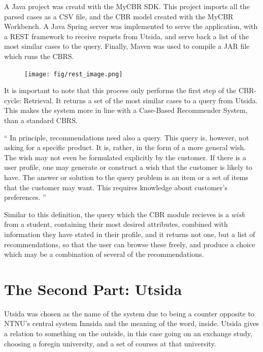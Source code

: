 A Java project was creatd with the MyCBR SDK. This project imports all the parsed cases as a CSV file, and the CBR model created with the MyCBR Workbench. A Java Spring server was implemented to serve the application, with a REST framework to receive requets from Utsida, and serve back a list of the most similar cases to the query. Finally, Maven was used to compile a JAR file which runs the CBRS. 

\begin{figure}[H]
    \centering
    \texttt{[image: fig/rest\_image.png]}
\end{figure}

It is important to note that this process only performs the first step of the CBR-cycle: Retrieval. It returns a set of the most similar cases to a query from Utsida. This makes the system more in line with a Case-Based Recommender System, than a standard CBRS. 

\begin{displayquote}\enquote{
In principle, recommendations need also a query. This query is, however, not asking
for a specific product. It is, rather, in the form of a more general wish. The wish may
not even be formulated explicitly by the customer. If there is a user profile, one may
generate or construct a wish that the customer is likely to have.
The answer or solution to the query problem is an item or a set of items that the
customer may want. This requires knowledge about customer’s preferences.\cite{richter2013case}
}\end{displayquote}

Similar to this definition, the query which the CBR module recieves is a \emph{wish} from a student, containing their most desired attributes, combined with information they have stated in their profile, and it returns not one, but a list of recommendations, so that the user can browse these freely, and produce a choice which may be a combination of several of the recommendations.

\section{The Second Part: Utsida}
Utsida was chosen as the name of the system due to being a counter opposite to NTNU's central system Innsida and the meaning of the word, inside. Utsida gives a relation to something on the outside, in this case going on an exchange study, choosing a foregin university, and a set of courses at that university.


